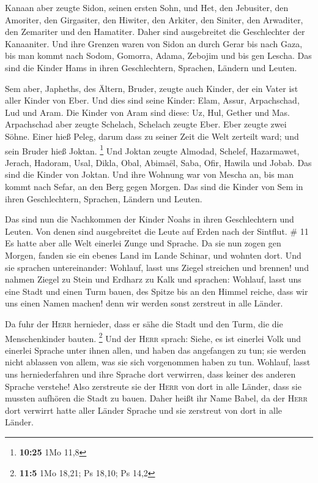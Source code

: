  Kanaan aber zeugte Sidon, seinen ersten Sohn, und Het,
 den Jebusiter, den Amoriter, den Girgasiter,
 den Hiwiter, den Arkiter, den Siniter, 
den Arwaditer, den Zemariter und den Hamatiter. Daher sind ausgebreitet
die Geschlechter der Kanaaniter.  Und ihre Grenzen waren
von Sidon an durch Gerar bis nach Gaza, bis man kommt nach Sodom,
Gomorra, Adama, Zebojim und bis gen Lescha.  Das sind die
Kinder Hams in ihren Geschlechtern, Sprachen, Ländern und Leuten.

 Sem aber, Japheths, des Ältern, Bruder, zeugte auch
Kinder, der ein Vater ist aller Kinder von Eber.  Und
dies sind seine Kinder: Elam, Assur, Arpachschad, Lud und Aram.
 Die Kinder von Aram sind diese: Uz, Hul, Gether und Mas.
 Arpachschad aber zeugte Schelach, Schelach zeugte Eber.
 Eber zeugte zwei Söhne. Einer hieß Peleg, darum dass zu
seiner Zeit die Welt zerteilt ward; und sein Bruder hieß Joktan.
\footnote{\textbf{10:25} 1Mo 11,8}  Und Joktan zeugte
Almodad, Schelef, Hazarmawet, Jerach,  Hadoram, Usal,
Dikla,  Obal, Abimaël, Saba,  Ofir, Hawila
und Jobab. Das sind die Kinder von Joktan.  Und ihre
Wohnung war von Mescha an, bis man kommt nach Sefar, an den Berg gegen
Morgen.  Das sind die Kinder von Sem in ihren
Geschlechtern, Sprachen, Ländern und Leuten.

 Das sind nun die Nachkommen der Kinder Noahs in ihren
Geschlechtern und Leuten. Von denen sind ausgebreitet die Leute auf
Erden nach der Sintflut. \# 11  Es hatte aber alle Welt
einerlei Zunge und Sprache.  Da sie nun zogen gen Morgen,
fanden sie ein ebenes Land im Lande Schinar, und wohnten dort.
 Und sie sprachen untereinander: Wohlauf, lasst uns Ziegel
streichen und brennen! und nahmen Ziegel zu Stein und Erdharz zu Kalk
 und sprachen: Wohlauf, lasst uns eine Stadt und einen
Turm bauen, des Spitze bis an den Himmel reiche, dass wir uns einen
Namen machen! denn wir werden sonst zerstreut in alle Länder.

 Da fuhr der \textsc{Herr} hernieder, dass er sähe die
Stadt und den Turm, die die Menschenkinder bauten. \footnote{\textbf{11:5}
  1Mo 18,21; Ps 18,10; Ps 14,2}  Und der \textsc{Herr}
sprach: Siehe, es ist einerlei Volk und einerlei Sprache unter ihnen
allen, und haben das angefangen zu tun; sie werden nicht ablassen von
allem, was sie sich vorgenommen haben zu tun.  Wohlauf,
lasst uns herniederfahren und ihre Sprache dort verwirren, dass keiner
des anderen Sprache verstehe!  Also zerstreute sie der
\textsc{Herr} von dort in alle Länder, dass sie mussten aufhören die
Stadt zu bauen.  Daher heißt ihr Name Babel, da der
\textsc{Herr} dort verwirrt hatte aller Länder Sprache und sie zerstreut
von dort in alle Länder.

